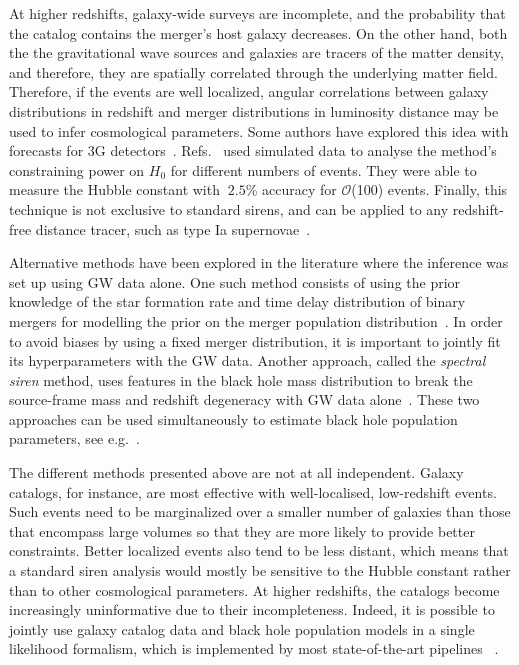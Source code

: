 \documentclass[%
preprint,
nofootinbib,
 amsmath,amssymb,
 aps,
]{revtex4-2}
\begin{document}
At higher redshifts, galaxy-wide surveys are incomplete, and the probability that the catalog
contains the merger's host galaxy decreases. On the other hand, both the the gravitational wave
sources and galaxies are tracers of the matter density, and therefore, they are spatially
correlated through the underlying matter field. Therefore, if the events are well localized,
angular correlations between galaxy distributions in redshift and merger distributions in
luminosity distance may be used to infer cosmological parameters. Some authors have explored this
idea with forecasts for 3G detectors~\cite{Oguri_2016}. Refs.~
used simulated data to analyse the method's constraining power on $H_0$ for different numbers of
events. They were able to measure the Hubble constant with $~ 2.5\%$ accuracy for
$\mathcal{O}$(100) events. Finally, this technique is not exclusive to standard sirens, and can be
applied to any redshift-free distance tracer, such as type Ia
supernovae~\cite{mukherjee2018classical}.

Alternative methods have been explored in the literature where the inference was set up using GW
data alone. One such method consists of using the prior knowledge of the star formation rate and
time delay distribution of binary mergers for modelling the prior on the merger population
distribution~\cite{Ding_2019, Ye_2021, Leandro_2022}. In order to avoid biases by using a fixed
merger distribution, it is important to jointly fit its hyperparameters with the GW data. Another
approach, called the \textit{spectral siren} method, uses features in the black hole mass
distribution to break the source-frame mass and redshift degeneracy with GW data
alone~\cite{Ezquiaga:2022zkx}. These two approaches can be used simultaneously to estimate black
hole population parameters, see e.g.~\cite{mancarella_cosmology_2022}.

The different methods presented above are not at all independent. Galaxy catalogs, for instance,
are most effective with well-localised, low-redshift events. Such events need to be marginalized
over a smaller number of galaxies than those that encompass large volumes so that they are more
likely to provide better constraints. Better localized events also tend to be less distant, which
means that a standard siren analysis would mostly be sensitive to the Hubble constant rather than
to other cosmological parameters. At higher redshifts, the catalogs become increasingly
uninformative due to their incompleteness. Indeed, it is possible to jointly use galaxy catalog
data and black hole population models in a single likelihood formalism, which is implemented by
most state-of-the-art pipelines ~\cite{Mastrogiovanni:2023emh,gray2023joint,borghi_cosmology_2023}.
\end{document}
